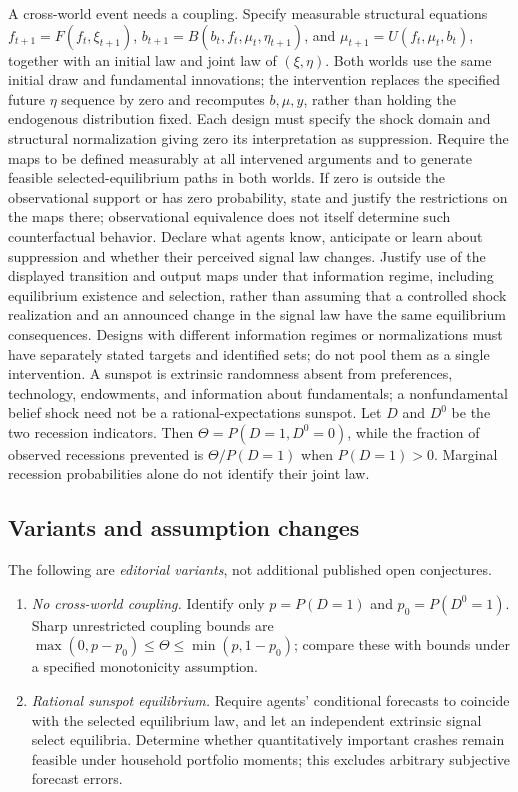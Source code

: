 \documentclass[11pt,a4paper]{article}
\begin{document}
A cross-world event needs a coupling. Specify measurable structural equations \(f_{t+1}=F(f_t,\xi_{t+1})\), \(b_{t+1}=B(b_t,f_t,\mu_t,\eta_{t+1})\), and \(\mu_{t+1}=U(f_t,\mu_t,b_t)\), together with an initial law and joint law of \((\xi,\eta)\). Both worlds use the same initial draw and fundamental innovations; the intervention replaces the specified future \(\eta\) sequence by zero and recomputes \(b,\mu,y\), rather than holding the endogenous distribution fixed. Each design must specify the shock domain and structural normalization giving zero its interpretation as suppression. Require the maps to be defined measurably at all intervened arguments and to generate feasible selected-equilibrium paths in both worlds. If zero is outside the observational support or has zero probability, state and justify the restrictions on the maps there; observational equivalence does not itself determine such counterfactual behavior. Declare what agents know, anticipate or learn about suppression and whether their perceived signal law changes. Justify use of the displayed transition and output maps under that information regime, including equilibrium existence and selection, rather than assuming that a controlled shock realization and an announced change in the signal law have the same equilibrium consequences. Designs with different information regimes or normalizations must have separately stated targets and identified sets; do not pool them as a single intervention. A sunspot is extrinsic randomness absent from preferences, technology, endowments, and information about fundamentals; a nonfundamental belief shock need not be a rational-expectations sunspot. Let \(D\) and \(D^0\) be the two recession indicators. Then \(\Theta=P(D=1,D^0=0)\), while the fraction of observed recessions prevented is \(\Theta/P(D=1)\) when \(P(D=1)>0\). Marginal recession probabilities alone do not identify their joint law.
\subsection*{Variants and assumption changes}
The following are \emph{editorial variants}, not additional published open conjectures.
\begin{enumerate}
\item \emph{No cross-world coupling.} Identify only \(p=P(D=1)\) and \(p_0=P(D^0=1)\). Sharp unrestricted coupling bounds are \(\max(0,p-p_0)\le\Theta\le\min(p,1-p_0)\); compare these with bounds under a specified monotonicity assumption.
\item \emph{Rational sunspot equilibrium.} Require agents' conditional forecasts to coincide with the selected equilibrium law, and let an independent extrinsic signal select equilibria. Determine whether quantitatively important crashes remain feasible under household portfolio moments; this excludes arbitrary subjective forecast errors.
\end{enumerate}
\end{document}
